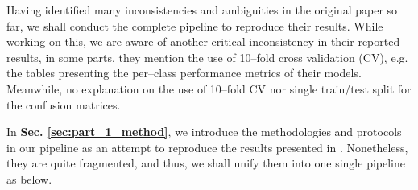 \label{sec:part_1_result_analysis}

Having identified many inconsistencies and ambiguities in the original paper so far, we shall conduct the complete pipeline to reproduce their results.
While working on this, we are aware of another critical inconsistency in their reported results, in some parts, they mention the use of 10–fold cross validation (CV), e.g. the tables presenting the per–class performance metrics of their models.
Meanwhile, no explanation on the use of 10–fold CV nor single train/test split for the confusion matrices.

In \textbf{Sec. \ref{sec:part_1_method}}, we introduce the methodologies and protocols in our pipeline as an attempt to reproduce the results presented in \cite{sinha2023dasmcc}.
Nonetheless, they are quite fragmented, and thus, we shall unify them into one single pipeline as below.

